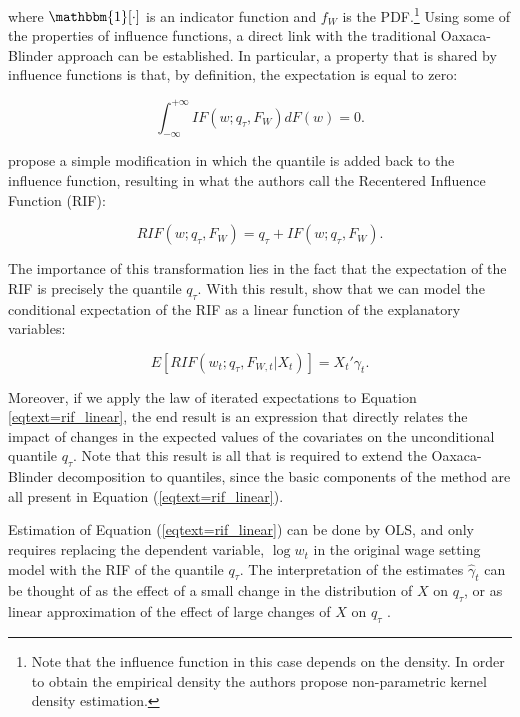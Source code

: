 \noindent where $\mathbbm{1}[\cdot]$ is an indicator function and $f_{W}$ is the PDF.\footnote{Note that the influence function in this case depends on the density. In order to obtain the empirical density the authors propose non-parametric kernel density estimation.} Using some of the properties of influence functions, a direct link with the traditional Oaxaca-Blinder approach can be established. In particular, a property that is shared by influence functions is that, by definition, the expectation is equal to zero:

\begin{equation}
\int_{-\infty}^{+\infty} IF(w;q_{\tau}, F_{W}) d F(w)=0.
\end{equation}

\citet{Firpoetal09} propose a simple modification in which the quantile is added back to the influence function, resulting in what the authors call the Recentered Influence Function (RIF):

\begin{equation}
RIF(w;q_{\tau}, F_{W})=q_{\tau}+IF(w;q_{\tau}, F_{W}).
\end{equation}

\noindent The importance of this transformation lies in the fact that the expectation of the RIF is precisely the quantile $q_{\tau}$. With this result, \citet{Firpoetal09} show that we can model the conditional expectation of the RIF as a linear function of the explanatory variables:

\begin{equation}
\label{eqtext=rif_linear}
E[RIF(w_{t};q_{\tau}, F_{W,t}|X_{t})] = X_{t}'\gamma_{t}.
\end{equation}

Moreover, if we apply the law of iterated expectations to Equation \eqref{eqtext=rif_linear}, the end result is an expression that directly relates the impact of changes in the expected values of the covariates on the unconditional quantile $q_{\tau}$. Note that this result is all that is required to extend the Oaxaca-Blinder decomposition to quantiles, since the basic components of the method are all present in Equation (\ref{eqtext=rif_linear}).

Estimation of Equation (\ref{eqtext=rif_linear}) can be done by OLS, and only requires replacing the dependent variable, $\log w_{t}$ in the original wage setting model with the RIF of the quantile $q_{\tau}$. The interpretation of the estimates $\widehat{\gamma}_{t}$ can be thought of as the effect of a small change in the distribution of $X$ on $q_{\tau}$, or as linear approximation of the effect of large changes of $X$ on $q_{\tau}$ \citep{Firpoetal07}.